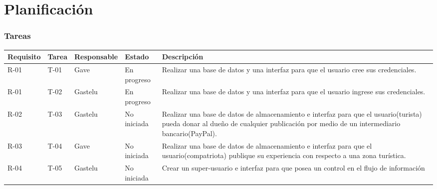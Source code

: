 \chapter{Planificación}
\subsection{Tareas}
\begin{table}[htbp]
	\begin{center}
		\begin{tabular}{| p{1.8cm}| p{1.2cm}| p{2.4cm}|p{2.2cm} |p{7.8cm} |}
			\hline
			\textbf{Requisito} & \textbf{Tarea} & \textbf {Responsable}& \textbf{Estado} & \textbf{Descripción}
			\\\hline  
			R-01&T-01&Gave&En progreso&Realizar una base de datos y una interfaz para que el usuario cree sus credenciales.
			\\ \hline
			R-01&T-02&Gastelu&En progreso&Realizar una base de datos y una interfaz para que el usuario ingrese sus credenciales.
			\\ \hline
			R-02&T-03&Gastelu&No iniciada&Realizar una base de datos de almacenamiento e interfaz para que el usuario(turista) pueda donar al dueño de cualquier publicación por medio de un intermediario bancario(PayPal).
			\\ \hline
			R-03&T-04&Gave&No iniciada&Realizar una base de datos de almacenamiento e interfaz para que el usuario(compatriota) publique su experiencia con respecto a una zona turística.
			\\ \hline
			R-04&T-05&Gastelu&No iniciada&Crear un super-usuario e interfaz para que posea un control en el flujo de información 
			\\ \hline	
	\end{tabular}
\end{center}
\end{table}
